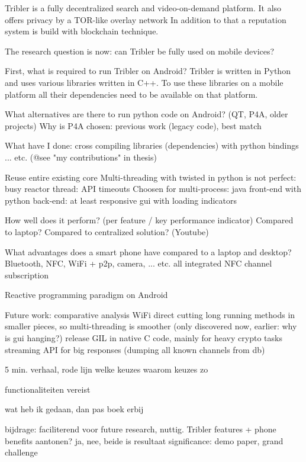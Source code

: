 Tribler is a fully decentralized search and video-on-demand platform.
It also offers privacy by a TOR-like overlay network 
In addition to that a reputation system is build with blockchain technique.

The research question is now: can Tribler be fully used on mobile devices?

First, what is required to run Tribler on Android?
Tribler is written in Python and uses various libraries written in C++.
To use these libraries on a mobile platform all their dependencies need to be available on that platform.


What alternatives are there to run python code on Android? (QT, P4A, older projects)
Why is P4A chosen: previous work (legacy code), best match

What have I done: cross compiling libraries (dependencies) with python bindings
... etc. (@see "my contributions" in thesis)


Reuse entire existing core
Multi-threading with twisted in python is not perfect: busy reactor thread: API timeouts
Choosen for multi-process: java front-end with python back-end: at least responsive gui with loading indicators



How well does it perform? (per feature / key performance indicator)
Compared to laptop?
Compared to centralized solution? (Youtube)

What advantages does a smart phone have compared to a laptop and desktop?
Bluetooth, NFC, WiFi + p2p, camera, ... etc. all integrated
NFC channel subscription

Reactive programming paradigm on Android

Future work:
comparative analysis
WiFi direct
cutting long running methods in smaller pieces, so multi-threading is smoother (only discovered now, earlier: why is gui hanging?)
release GIL in native C code, mainly for heavy crypto tasks
streaming API for big responses (dumping all known channels from db)



5 min. verhaal, rode lijn
welke keuzes
waarom keuzes zo

functionaliteiten vereist


wat heb ik gedaan, dan pas boek erbij


bijdrage: faciliterend voor future research, nuttig. Tribler features + phone benefits
aantonen? ja, nee, beide is resultaat
significance: demo paper, grand challenge

